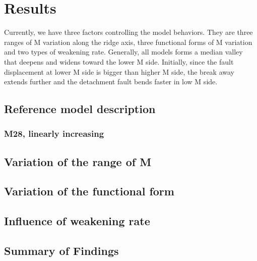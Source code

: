 \pagebreak
\section{Results}

Currently, we have three factors controlling the model behaviors. They are three ranges of M variation along the ridge axis, three functional forms of M variation and two types of weakening rate. Generally, all models forms a median valley that deepens and widens toward the lower M side. Initially, since the fault displacement at lower M side is bigger than higher M side, the break away extends further and the detachment fault bends faster in low M side.

\subsection{Reference model description}
\subsubsection{M28, linearly increasing}
\subsection{Variation of the range of M}

\subsection{Variation of the functional form}
\subsection{Influence of weakening rate}
\subsection{Summary of Findings}
